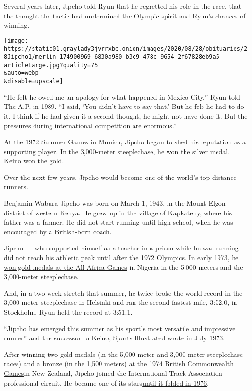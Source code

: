 Several years later, Jipcho told Ryun that he regretted his role in the
race, that the thought the tactic had undermined the Olympic spirit and
Ryun's chances of winning.

\texttt{[image: https://static01.graylady3jvrrxbe.onion/images/2020/08/28/obituaries/28Jipcho1/merlin\_174900969\_6830a980-b3c9-478c-9654-2f67828eb9a5-articleLarge.jpg?quality=75\\\&auto=webp\\\&disable=upscale]}

``He felt he owed me an apology for what happened in Mexico City,'' Ryun
told The A.P. in 1989. ``I said, `You didn't have to say that.' But he
felt he had to do it. I think if he had given it a second thought, he
might not have done it. But the pressures during international
competition are enormous.''

At the 1972 Summer Games in Munich, Jipcho began to shed his reputation
as a supporting player.
\href{https://web.archive.org/web/20200417174448/https://www.sports-reference.com/olympics/athletes/ji/ben-jipcho-1.html}{In
the 3,000-meter steeplechase,} he won the silver medal. Keino won the
gold.

Over the next few years, Jipcho would become one of the world's top
distance runners.

Benjamin Wabura Jipcho was born on March 1, 1943, in the Mount Elgon
district of western Kenya. He grew up in the village of Kapkateny, where
his father was a farmer. He did not start running until high school,
when he was encouraged by a British-born coach.

Jipcho --- who supported himself as a teacher in a prison while he was
running --- did not reach his athletic peak until after the 1972
Olympics. In early 1973,
\href{https://en.wikipedia.org/wiki/Athletics_at_the_1973_All-Africa_Games}{he
won gold medals at the All-Africa Games} in Nigeria in the 5,000 meters
and the 3,000-meter steeplechase.

And, in a two-week stretch that summer, he twice broke the world record
in the 3,000-meter steeplechase in Helsinki and ran the second-fastest
mile, 3:52.0, in Stockholm. Ryun held the record at 3:51.1.

``Jipcho has emerged this summer as his sport's most versatile and
impressive runner'' and the successor to Keino,
\href{https://vault.si.com/vault/1973/07/30/jipcho-is-hitting-his-stride}{Sports
Illustrated wrote in July 1973}.

After winning two gold medals (in the 5,000-meter and 3,000-meter
steeplechase races) and a bronze (in the 1,500 meters) at the
\href{https://en.wikipedia.org/wiki/Athletics_at_the_1974_British_Commonwealth_Games\#:~:text=The\%20QE\%20II\%20Park\%20was\%20purpose\%2Dbuilt\%20for\%20the\%201974\%20Games.\&text=At\%20the\%201974\%20British\%20Commonwealth\%20Games\%2C\%20the\%20athletics\%20events\%20were,25\%20January\%20and\%202\%20February.}{1974
British Commonwealth Games}in New Zealand, Jipcho joined the
International Track Association professional circuit. He became one of
its
stars\href{http://www.thesportsexaminer.com/lane-one-echoes-of-the-failed-intl-track-association-in-the-new-intl-swimming-league/}{until
it folded in 1976}.

